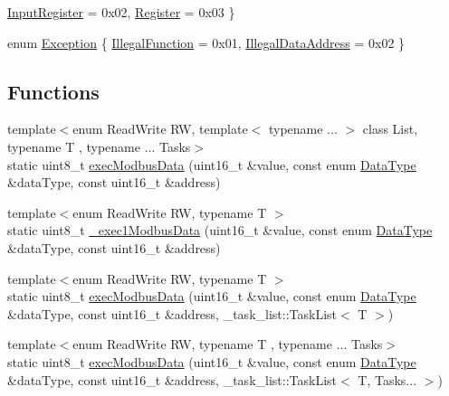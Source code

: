 \begin{DoxyCompactItemize}
\newline
\hyperlink{namespace__modbus_a85902c8bc1ff424855dad072259df913a561f9fa1fa40f9591d08d69ccef1824f}{Input\+Register} = 0x02, 
\newline
\hyperlink{namespace__modbus_a85902c8bc1ff424855dad072259df913a8a612dd665a7957aa98a0a196ce3d75f}{Register} = 0x03
 \}
\item 
enum \hyperlink{namespace__modbus_a433e0b37ee938eed20bb3dcc62e44f54}{Exception} \{ \newline
\hyperlink{namespace__modbus_a433e0b37ee938eed20bb3dcc62e44f54a5d61e848a89450255cf483485eb2c838}{Illegal\+Function} = 0x01, 
\newline
\hyperlink{namespace__modbus_a433e0b37ee938eed20bb3dcc62e44f54a963ac4ce18bd047b6ec1e67534c43d3a}{Illegal\+Data\+Address} = 0x02
 \}
\end{DoxyCompactItemize}
\subsection*{Functions}
\begin{DoxyCompactItemize}
\item 
{\footnotesize template$<$enum Read\+Write RW, template$<$ typename ... $>$ class List, typename T , typename ... Tasks$>$ }\\static uint8\+\_\+t \hyperlink{namespace__modbus_a0742ac6898215f382cee074b310d12ba}{exec\+Modbus\+Data} (uint16\+\_\+t \&value, const enum \hyperlink{namespace__modbus_a85902c8bc1ff424855dad072259df913}{Data\+Type} \&data\+Type, const uint16\+\_\+t \&address)
\item 
{\footnotesize template$<$enum Read\+Write RW, typename T $>$ }\\static uint8\+\_\+t \hyperlink{namespace__modbus_a7f7adbe09d891d89aef2766be0f3f67e}{\+\_\+exec1\+Modbus\+Data} (uint16\+\_\+t \&value, const enum \hyperlink{namespace__modbus_a85902c8bc1ff424855dad072259df913}{Data\+Type} \&data\+Type, const uint16\+\_\+t \&address)
\item 
{\footnotesize template$<$enum Read\+Write RW, typename T $>$ }\\static uint8\+\_\+t \hyperlink{namespace__modbus_a2065bae9b1040bd1b1b6913f39793370}{exec\+Modbus\+Data} (uint16\+\_\+t \&value, const enum \hyperlink{namespace__modbus_a85902c8bc1ff424855dad072259df913}{Data\+Type} \&data\+Type, const uint16\+\_\+t \&address, \+\_\+task\+\_\+list\+::\+Task\+List$<$ T $>$)
\item 
{\footnotesize template$<$enum Read\+Write RW, typename T , typename ... Tasks$>$ }\\static uint8\+\_\+t \hyperlink{namespace__modbus_a0e0c328bb7fcf1f7e252b22c753219dd}{exec\+Modbus\+Data} (uint16\+\_\+t \&value, const enum \hyperlink{namespace__modbus_a85902c8bc1ff424855dad072259df913}{Data\+Type} \&data\+Type, const uint16\+\_\+t \&address, \+\_\+task\+\_\+list\+::\+Task\+List$<$ T, Tasks... $>$)
\end{DoxyCompactItemize}



